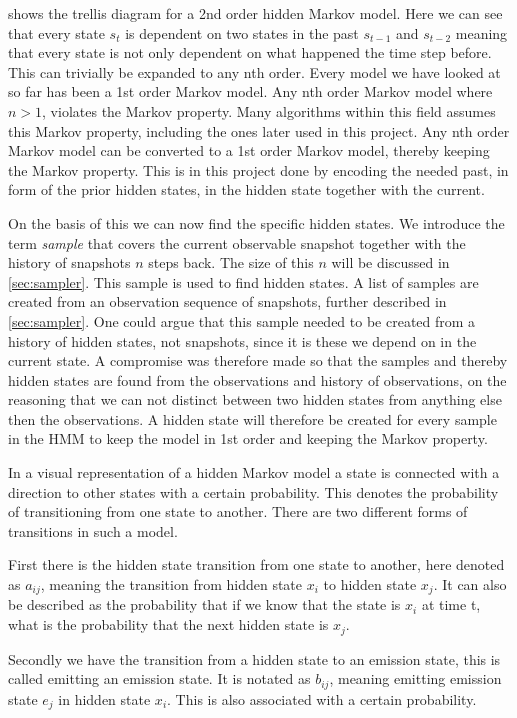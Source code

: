  shows the trellis diagram for a 2nd order hidden Markov model. Here we can see that every state $s_t$ is dependent on two states in the past $s_{t-1}$ and $s_{t-2}$ meaning that every state is not only dependent on what happened the time step before. This can trivially be expanded to any nth order. Every model we have looked at so far has been a 1st order Markov model. Any nth order Markov model where $n>1$, violates the Markov property. Many algorithms within this field assumes this Markov property, including the ones later used in this project. Any nth order Markov model can be converted to a 1st order Markov model, thereby keeping the Markov property. This is in this project done by encoding the needed past, in form of the prior hidden states, in the hidden state together with the current.

On the basis of this we can now find the specific hidden states. We introduce the term \emph{sample} that covers the current observable snapshot together with the history of snapshots $n$ steps back. The size of this $n$ will be discussed in \cref{sec:sampler}. This sample is used to find hidden states. A list of samples are created from an observation sequence of snapshots, further described in \cref{sec:sampler}. One could argue that this sample needed to be created from a history of hidden states, not snapshots, since it is these we depend on in the current state. A compromise was therefore made so that the samples and thereby hidden states are found from the observations and history of observations, on the reasoning that we can not distinct between two hidden states from anything else then the observations. A hidden state will therefore be created for every sample in the HMM to keep the model in 1st order and keeping the Markov property.

In a visual representation of a hidden Markov model a state is connected with a direction to other states with a certain probability. This denotes the probability of transitioning from one state to another. There are two different forms of transitions in such a model.

First there is the hidden state transition from one state to another, here denoted as $a_{ij}$, meaning the transition from hidden state $x_i$ to hidden state $x_j$. It can also be described as the probability that if we know that the state is $x_i$ at time t, what is the probability that the next hidden state is $x_j$.

Secondly we have the transition from a hidden state to an emission state, this is called emitting an emission state. It is notated as $b_{ij}$, meaning emitting emission state $e_j$ in hidden state $x_i$. This is also associated with a certain probability.

